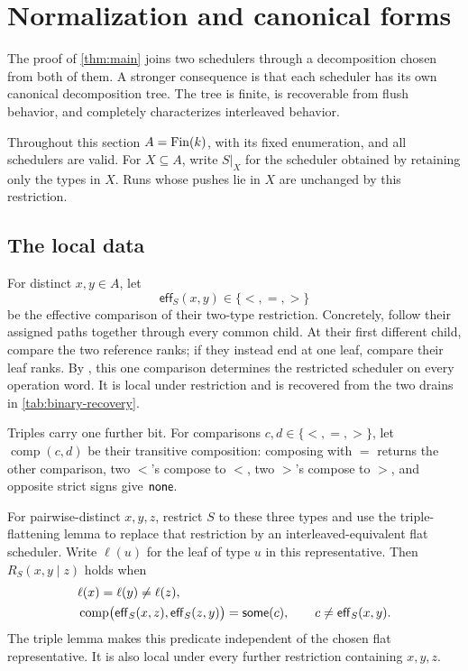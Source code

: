 \section{Normalization and canonical forms}
\label{sec:normalization-canonical}

The proof of \autoref{thm:main} joins two schedulers through a decomposition
chosen from both of them.  A stronger consequence is that each scheduler has
its own canonical decomposition tree.  The tree is finite, is recoverable from
flush behavior, and completely characterizes interleaved behavior.

Throughout this section \(A=\operatorname{Fin}(k)\), with its fixed enumeration, and all
schedulers are valid.  For \(X\subseteq A\), write \(S|_X\) for the scheduler
obtained by retaining only the types in \(X\).  Runs whose pushes lie in \(X\)
are unchanged by this restriction.

\subsection{The local data}

For distinct \(x,y\in A\), let
\[
  \mathsf{eff}_S(x,y)\in\{<,=,>\}
\]
be the effective comparison of their two-type restriction.  Concretely,
follow their assigned paths together through every common child.  At their
first different child, compare the two reference ranks; if they instead end
at one leaf, compare their leaf ranks.  By , this one
comparison determines the restricted scheduler on every operation word.  It
is local under restriction and is recovered from the two drains in
\autoref{tab:binary-recovery}.

Triples carry one further bit.  For comparisons \(c,d\in\{<,=,>\}\), let
\(\operatorname{comp}(c,d)\) be their transitive composition: composing with
\(=\) returns the other comparison, two \(<\)'s compose to \(<\), two
\(>\)'s compose to \(>\), and opposite strict signs give \(\mathsf{none}\).

\begin{definition}
\label{def:rooted-obstruction}
For pairwise-distinct \(x,y,z\), restrict \(S\) to these three types and use
the triple-flattening lemma to replace that restriction by an
interleaved-equivalent flat scheduler.  Write \(\ell(u)\) for the leaf of
type \(u\) in this representative.  Then \(R_S(x,y\mid z)\) holds when
\begin{equation}
\begin{split}
  &\ell(x)=\ell(y)\ne\ell(z),\\
  &\operatorname{comp}
      \bigl(\mathsf{eff}_S(x,z),\mathsf{eff}_S(z,y)\bigr)=\mathsf{some}(c),
    \qquad c\ne\mathsf{eff}_S(x,y).
\end{split}
\label{eq:rooted-obstruction}
\end{equation}
The triple lemma makes this predicate independent of the chosen flat
representative.  It is also local under every further restriction containing
\(x,y,z\).
\end{definition}

